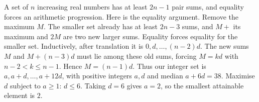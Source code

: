 A set of $n$ increasing real numbers has at least $2n-1$ pair sums, and equality forces an arithmetic progression. Here is the equality argument. Remove the maximum $M$. The smaller set already has at least $2n-3$ sums, and $M+$ its maximum and $2M$ are two new larger sums. Equality forces equality for the smaller set. Inductively, after translation it is $0,d,\ldots,(n-2)d$. The new sums $M$ and $M+(n-3)d$ must lie among these old sums, forcing $M=kd$ with $n-2<k\le n-1$. Hence $M=(n-1)d$.
Thus our integer set is $a,a+d,\ldots,a+12d$, with positive integers $a,d$ and median $a+6d=38$. Maximise $d$ subject to $a\ge1$: $d\le6$. Taking $d=6$ gives $a=2$, so the smallest attainable element is $\boxed2$.
